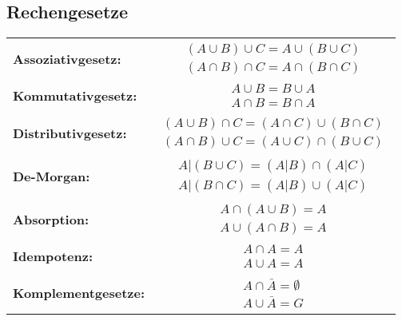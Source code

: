\subsection*{Rechengesetze}
\begin{tabular} {l | l}
  \textbf{Assoziativgesetz:} & 
  \parbox{4.5cm}{\begin{equation*}
    \begin{aligned}
      (A \cup B) \cup C = A \cup (B \cup C) \\
      (A \cap B) \cap C = A \cap (B \cap C)
    \end{aligned}
  \end{equation*}}
  \\
  \textbf{Kommutativgesetz:} & 
  \parbox{3cm}{\begin{equation*}
    \begin{aligned}
      A \cup B = B \cup A \\
      A \cap B = B \cap A
    \end{aligned}
  \end{equation*}}
  \\
  \textbf{Distributivgesetz:} & 
  \parbox{5.5cm}{\begin{equation*}
    \begin{aligned}
      (A \cup B) \cap C = (A \cap C) \cup (B \cap C) \\
      (A \cap B) \cup C = (A \cup C) \cap (B \cup C)
    \end{aligned}
  \end{equation*}}
  \\
  \textbf{De-Morgan:} & 
  \parbox{4.5cm}{\begin{equation*}
    \begin{aligned}
      A | (B \cup C) = (A | B) \cap (A | C) \\
      A | (B \cap C) = (A | B) \cup (A | C)
    \end{aligned}
  \end{equation*}}
  \\
  \textbf{Absorption:} & 
  \parbox{3cm}{\begin{equation*}
    \begin{aligned}
      A \cap (A \cup B) = A \\
      A \cup (A \cap B) = A
    \end{aligned}
  \end{equation*}}
  \\
  \textbf{Idempotenz:} & 
  \parbox{3cm}{\begin{equation*}
    \begin{aligned}
      A \cap A = A \\
      A \cup A = A
    \end{aligned}
  \end{equation*}}
  \\
  \textbf{Komplementgesetze:} & 
  \parbox{3cm}{\begin{equation*}
    \begin{aligned}
      A \cap \bar{A} = \emptyset \\
      A \cup \bar{A} = G
    \end{aligned}
  \end{equation*}}
\end{tabular}


